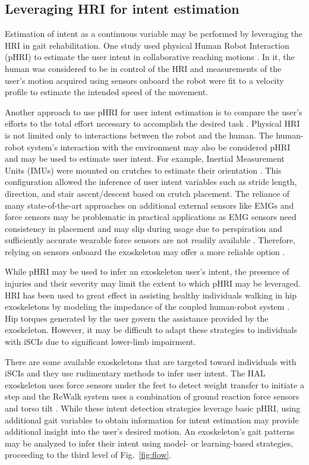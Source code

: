 \subsection{Leveraging HRI for intent estimation}

Estimation of intent as a continuous variable may be performed by leveraging the HRI in gait rehabilitation. One study used physical Human Robot Interaction (pHRI) to estimate the user intent in collaborative reaching motions  \cite{corteville2007human}. In it, the human was considered to be in control of the HRI and measurements of the user's motion acquired using sensors onboard the robot were fit to a velocity profile to estimate the intended speed of the movement. 

Another approach to use pHRI for user intent estimation is to compare the user's efforts to the total effort necessary to accomplish the desired task \cite{pehlivan2015minimal}. Physical HRI is not limited only to interactions between the robot and the human. The human-robot system's interaction with the environment may also be considered pHRI and may be used to estimate user intent. For example, Inertial Measurement Units (IMUs) were mounted on crutches to estimate their orientation \cite{brescianini2011ins}. This configuration allowed the inference of user intent variables such as stride length, direction, and stair ascent/descent based on crutch placement. The reliance of many state-of-the-art approaches on additional external sensors like EMGs and force sensors may be problematic in practical applications as EMG sensors need consistency in placement and may slip during usage due to perspiration \cite{tkach2010study,ison2014role} and sufficiently accurate wearable force sensors are not readily available \cite{moolchandani2021design}. Therefore, relying on sensors onboard the exoskeleton may offer a more reliable option \cite{Gambon20b}. 

While pHRI may be used to infer an exoskeleton user's intent, the presence of injuries and their severity may limit the extent to which pHRI may be leveraged. HRI has been used to great effect in assisting healthy individuals walking in hip exoskeletons by modeling the impedance of the coupled human-robot system \cite{zhang2019admittance,nagarajan2016integral}. Hip torques generated by the user govern the assistance provided by the exoskeleton. However, it may be difficult to adapt these strategies to individuals with iSCIs due to significant lower-limb impairment. 

There are some available exoskeletons that are targeted toward individuals with iSCIs and they use rudimentary methods to infer user intent. The HAL exoskeleton uses force sensors under the feet to detect weight transfer to initiate a step \cite{suzuki2007intention} and the ReWalk system uses a combination of ground reaction force sensors and torso tilt \cite{goffer2012locomotion}. While these intent detection strategies leverage basic pHRI, using additional gait variables to obtain information for intent estimation may provide additional insight into the user's desired motion. An exoskeleton's gait patterns may be analyzed to infer their intent using model- or learning-based strategies, proceeding to the third level of Fig.~\ref{fig:flow}. 

